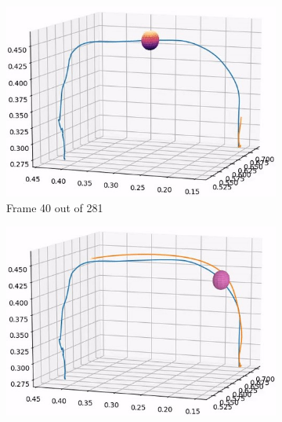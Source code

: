 \documentclass[../main.tex]{subfiles}
\begin{document}
\begin{figure}[H]
    \centering
    \begin{subfigure}[b]{0.32\textwidth}
        \centering
        \includegraphics[width=\textwidth]{figures/online_obs/original_param/3D_ori_param-40.jpg}
        \caption{Frame 40 out of 281}
    \end{subfigure}
    \begin{subfigure}[b]{0.32\textwidth}
        \centering
        \includegraphics[width=\textwidth]{figures/online_obs/original_param/3D_ori_param-70.jpg}

\end{subfigure}
\end{figure}
\end{document}
